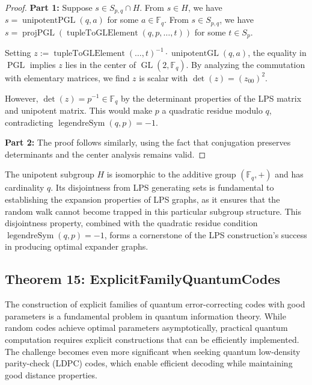 \documentclass[11pt]{article}
\theoremstyle{plain}
\theoremstyle{definition}
\theoremstyle{remark}
\begin{document}
\begin{proof}
\textbf{Part 1:} Suppose $s \in S_{p,q} \cap H$. From $s \in H$, we have $s = \operatorname{unipotentPGL}(q,a)$ for some $a \in \mathbb{F}_q$. From $s \in S_{p,q}$, we have $s = \operatorname{projPGL}(\operatorname{tupleToGLElement}(q,p,\ldots,t))$ for some $t \in S_p$.

Setting $z := \operatorname{tupleToGLElement}(\ldots,t)^{-1} \cdot \operatorname{unipotentGL}(q,a)$, the equality in $\operatorname{PGL}$ implies $z$ lies in the center of $\operatorname{GL}(2,\mathbb{F}_q)$. By analyzing the commutation with elementary matrices, we find $z$ is scalar with $\det(z) = (z_{00})^2$.

However, $\det(z) = p^{-1} \in \mathbb{F}_q$ by the determinant properties of the LPS matrix and unipotent matrix. This would make $p$ a quadratic residue modulo $q$, contradicting $\operatorname{legendreSym}(q,p) = -1$.

\textbf{Part 2:} The proof follows similarly, using the fact that conjugation preserves determinants and the center analysis remains valid.
\end{proof}

The unipotent subgroup $H$ is isomorphic to the additive group $(\mathbb{F}_q, +)$ and has cardinality $q$. Its disjointness from LPS generating sets is fundamental to establishing the expansion properties of LPS graphs, as it ensures that the random walk cannot become trapped in this particular subgroup structure. This disjointness property, combined with the quadratic residue condition $\operatorname{legendreSym}(q,p) = -1$, forms a cornerstone of the LPS construction's success in producing optimal expander graphs.

\vspace{1em}

\subsection{Theorem 15: ExplicitFamilyQuantumCodes}

The construction of explicit families of quantum error-correcting codes with good parameters is a fundamental problem in quantum information theory. While random codes achieve optimal parameters asymptotically, practical quantum computation requires explicit constructions that can be efficiently implemented. The challenge becomes even more significant when seeking quantum low-density parity-check (LDPC) codes, which enable efficient decoding while maintaining good distance properties.
\end{document}
